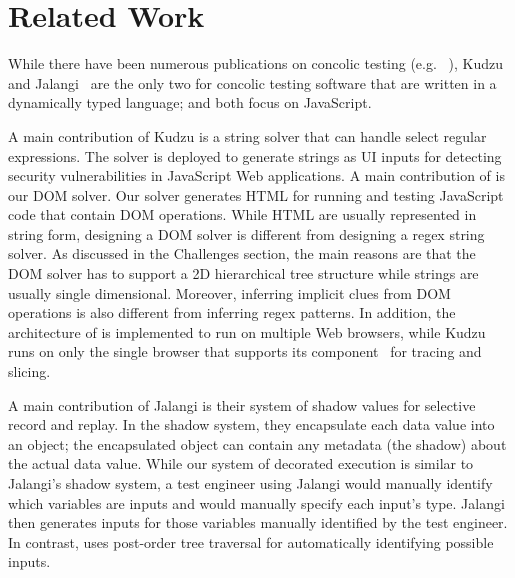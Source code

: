 \section{Related Work}


While there have been numerous publications on concolic testing (e.g. ~\cite{cute, klee, eventConcolic}), Kudzu~\cite{kudzu} and Jalangi~\cite{jalangi} are the only two for concolic testing software that are written in a dynamically typed language; and both focus on JavaScript.  

A main contribution of Kudzu is a string solver that can handle select regular expressions.  The solver is deployed to generate strings as UI inputs for detecting security vulnerabilities in JavaScript Web applications.   
A main contribution of \tool is our DOM solver.  Our solver generates HTML for running and testing JavaScript code that contain DOM operations.    
While HTML are usually represented in string form, designing a DOM solver is different from designing a regex string solver.
As discussed in the Challenges section, the main reasons are that the DOM solver has to support a 2D hierarchical tree structure while strings are usually single dimensional.  
Moreover, inferring implicit clues from DOM operations is also different from inferring regex patterns.  
In addition, the architecture of \tool is implemented to run on multiple Web browsers, while Kudzu runs on only the single browser that supports its component~\cite{flax} for tracing and slicing.    

A main contribution of Jalangi is their system of shadow values for selective record and replay.  In the shadow system, they encapsulate each data value into an object; the encapsulated object can contain any metadata (the shadow) about the actual data value.  
While our system of decorated execution is similar to Jalangi's shadow system, a test engineer using Jalangi would manually identify which variables are inputs and would manually specify each input's type.  
Jalangi then generates inputs for those variables manually identified by the test engineer.  In contrast, \tool uses post-order tree traversal for automatically identifying possible inputs.  

